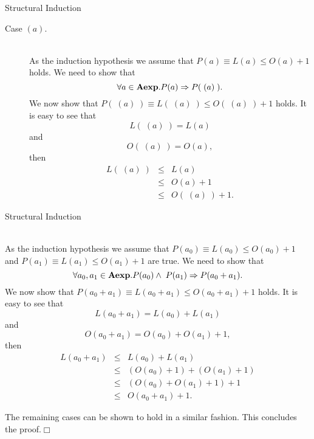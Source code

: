 \documentclass{beamer}
\begin{document}
\begin{frame}{Structural Induction}
\scriptsize
\begin{description}
\item[Case $( a )$.]\hspace{.1in}\\ 
As the induction hypothesis we assume that $P(a) \equiv L(a) \le O(a) + 1$ holds. 
We need to show that 
\[
\forall a \in \mbox{\bf Aexp}. P(a) \Rightarrow P(\; ( a ) \;).
\]
We now show that $P( \;( a ) \;)\equiv L( \;( a ) \;) \le  O( \;( a ) \;) + 1$ holds.
It is easy to see that 
\[
L( \;( a ) \;) = L(a)
\]
and
\[
O( \;( a ) \;) = O(a),
\]
then 
\begin{eqnarray*}
L( \;( a ) \;) &\le& L(a) \\
	&\le& O(a) + 1\\
	&\le& O( \;( a ) \;) + 1.
\end{eqnarray*}
\end{description} 
\end{frame}

\begin{frame}{Structural Induction}
\scriptsize
\begin{description}
\item[Case $a_0 + a_1$.]\hspace{.1in}\\ 
As the induction hypothesis we assume that $P(a_0) \equiv L(a_0) \le O(a_0) + 1$ and 
$P(a_1) \equiv L(a_1) \le O(a_1) + 1$ are true. 
We need to show that 
\[
\forall a_0, a_1 \in \mbox{\bf Aexp}. P(a_0) \wedge\; P(a_1) \Rightarrow P(a_0 + a_1).
\]
We now show that $P(a_0 + a_1)\equiv L(a_0 + a_1) \le  O(a_0 + a_1) + 1$ holds.
It is easy to see that 
\[
L(a_0 + a_1) = L(a_0) + L(a_1)
\]
and
\[
O(a_0 + a_1) = O(a_0) + O(a_1) + 1,
\]
then 
\begin{eqnarray*}
L(a_0 + a_1) &\le& L(a_0) + L(a_1) \\
	&\le& (O(a_0) + 1) + (O(a_1) + 1)\\
	&\le& (O(a_0) + O(a_1)+ 1) + 1\\
	& \le& O(a_0 + a_1) + 1.
\end{eqnarray*}
\item The remaining cases can be shown to hold in a similar fashion. 
This concludes the proof.$\Box$
\end{description} 
\end{frame}
\end{document}
